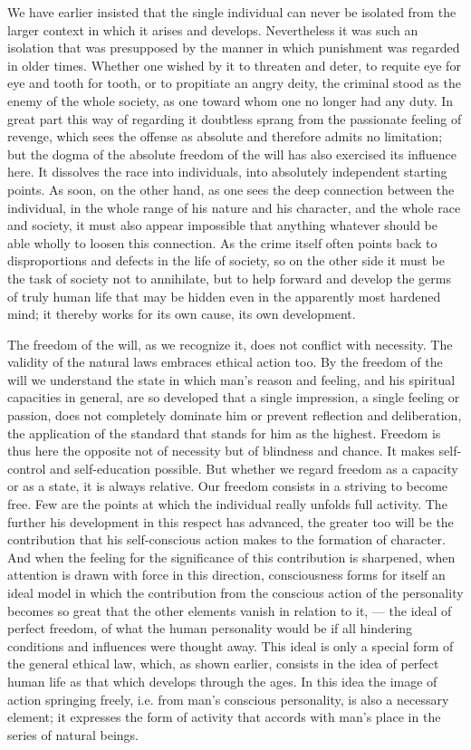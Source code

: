 \documentclass[12pt,a4paper,openany]{book}
\newcommand{\opage}[1]{\marginnote{\footnotesize\textit{[#1]}}}
\begin{document}
We have earlier insisted that the single individual can never be isolated
from the larger context in which it arises and develops. Nevertheless it was
such an isolation that was presupposed by the manner in which punishment was
regarded in older times. Whether one wished by it to threaten and deter, to
requite eye for eye and tooth for tooth, or to propitiate an angry deity,
the criminal stood as the enemy of the whole society, as one toward whom one
no longer had any duty. In great part this way of regarding it doubtless
sprang from the passionate feeling of revenge, which sees the offense as
absolute and therefore admits no limitation; but the dogma of the absolute
freedom of the will has also exercised its influence here. It dissolves the
race into individuals, into absolutely independent starting
\opage{130}points. As soon, on the other hand, as one sees the deep
connection between the individual, in the whole range of his nature and his
character, and the whole race and society, it must also appear impossible
that anything whatever should be able wholly to loosen this connection. As
the crime itself often points back to disproportions and defects in the life
of society, so on the other side it must be the task of society not to
annihilate, but to help forward and develop the germs of truly human life
that may be hidden even in the apparently most hardened mind; it thereby
works for its own cause, its own development.

The freedom of the will, as we recognize it, does not conflict with
necessity. The validity of the natural laws embraces ethical action too. By
the freedom of the will we understand the state in which man's reason and
feeling, and his spiritual capacities in general, are so developed that a
single impression, a single feeling or passion, does not completely dominate
him or prevent reflection and deliberation, the application of the standard
that stands for him as the highest. Freedom is thus here the opposite not of
necessity but of blindness and chance. It makes self-control and
self-education possible. But whether we regard freedom as a capacity or as a
state, it is always relative. Our freedom consists in a striving to become
free. Few are the points at which the individual really unfolds full
activity. The further his development in this respect has
\opage{131}advanced, the greater too will be the contribution that his
self-conscious action makes to the formation of character. And when the
feeling for the significance of this contribution is sharpened, when
attention is drawn with force in this direction, consciousness forms for
itself an ideal model in which the contribution from the conscious action of
the personality becomes so great that the other elements vanish in relation
to it, --- the ideal of perfect freedom, of what the human personality would
be if all hindering conditions and influences were thought away. This ideal
is only a special form of the general ethical law, which, as shown earlier,
consists in the idea of perfect human life as that which develops through
the ages. In this idea the image of action springing freely, i.e. from man's
conscious personality, is also a necessary element; it expresses the form of
activity that accords with man's place in the series of natural beings.
\end{document}
